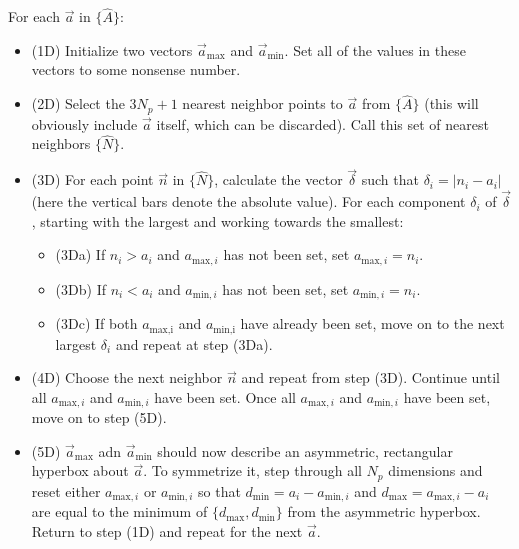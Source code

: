 \documentclass[useAMS,usenatbib]{aastex}
\begin{document}
For each $\vec{a}$ in $\{\hat{A}\}$:
\begin{itemize}
\item(1D) Initialize two vectors $\vec{a}_\text{max}$ and
$\vec{a}_\text{min}$.  Set all of the values in these vectors to some nonsense number.

\item(2D) Select the $3N_p+1$ nearest neighbor points to $\vec{a}$ from
$\{\hat{A}\}$ (this will obviously include $\vec{a}$ itself, which can be discarded).  Call
this set of nearest neighbors $\{\hat{N}\}$.
\\
\item(3D) For each point $\vec{n}$ in $\{\hat{N}\}$, calculate the vector
$\vec{\delta}$ such that $\delta_i=|n_i-a_i|$ (here the vertical bars denote the absolute value).  
For each component
$\delta_i$ of $\vec{\delta}$, starting with the largest and working towards the smallest:
\\
\begin{itemize}
\item(3Da) If $n_i>a_i$ and $a_{\text{max},i}$ has not been set, set $a_{\text{max},i}=n_i$.
\\
\item(3Db) If $n_i<a_i$ and $a_{\text{min},i}$ has not been set, set $a_{\text{min},i}=n_i$.
\\
\item(3Dc) If both $a_\text{max,i}$ and $a_\text{min,i}$ have already been set, move on to the
next largest $\delta_i$ and repeat at step (3Da).
\end{itemize}
\item(4D) Choose the next neighbor $\vec{n}$ and repeat from step (3D). Continue until all
$a_{\text{max},i}$ and $a_{\text{min},i}$ have been set.  Once all $a_{\text{max},i}$ and
$a_{\text{min},i}$ have been set, move on to step (5D).
\\
\item(5D) $\vec{a}_\text{max}$ adn $\vec{a}_\text{min}$ should now describe an asymmetric,
rectangular hyperbox about $\vec{a}$.  To symmetrize it, step through all $N_p$ dimensions
and reset either $a_{\text{max},i}$ or $a_{\text{min},i}$ so that 
$d_\text{min}=a_i-a_{\text{min},i}$ and
$d_\text{max}=a_{\text{max},i}-a_i$ are equal to the minimum of $\{d_\text{max},d_\text{min}\}$
from the asymmetric hyperbox.  Return to step (1D) and repeat for the next $\vec{a}$.
\end{itemize}
\end{document}
